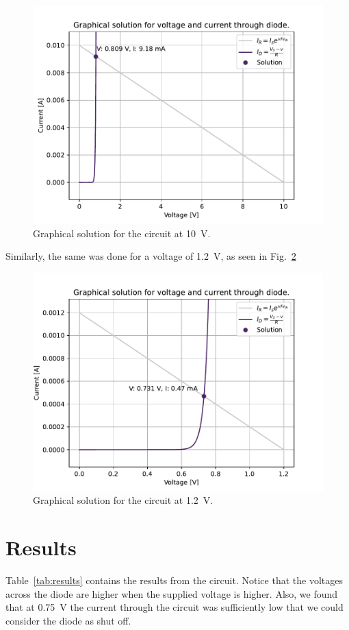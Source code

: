 \documentclass{../../ece-report}
\begin{document}
\begin{figure}[h!]
  \centering
  \includegraphics[width=0.7 \textwidth]{../plots/pdf/datasheet_diode_10V.pdf}
  \caption{Graphical solution for the circuit at 10~V.}
  \label{fig:10V}
\end{figure}

Similarly, the same was done for a voltage of 1.2~V, as seen in Fig.~\ref{fig:1.2V}

\begin{figure}[h!]
  \centering
  \includegraphics[width=0.7 \textwidth]{../plots/pdf/datasheet_diode_1.2V.pdf}
  \caption{Graphical solution for the circuit at 1.2~V.}
  \label{fig:1.2V}
\end{figure}


\section{Results}

Table~\ref{tab:results} contains the results from the circuit.
Notice that the voltages across the diode are higher when the 
supplied voltage is higher. Also, we found that at 0.75~V the current
through the circuit was sufficiently low that we could consider
the diode as shut off.
\end{document}
